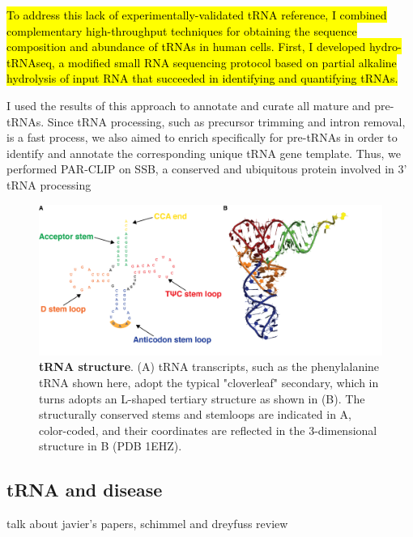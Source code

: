 \documentclass[12pt]{rockefeller}
\begin{document}
\hl{To address this lack of experimentally-validated tRNA reference, I combined complementary high-throughput techniques for obtaining the sequence composition and abundance of tRNAs in human cells. First, I developed hydro-tRNAseq, a modified small RNA sequencing protocol based on partial alkaline hydrolysis of input RNA that succeeded in identifying and quantifying tRNAs.}

I used the results of this approach to annotate and curate all mature and pre-tRNAs. Since tRNA processing, such as precursor trimming and intron removal, is a fast process\cite{Foretek:2016ea}, we also aimed to enrich specifically for pre-tRNAs in order to identify and annotate the corresponding unique tRNA gene template. Thus, we performed PAR-CLIP on SSB, a conserved and ubiquitous protein involved in 3’ tRNA processing \cite{Bayfield:2009cx,Bayfield:2010cs,Stefano:1984wp}

\begin{figure}[!ht]%
\centering
\includegraphics[width=\textwidth]{tRNA_general_structure.png}%
\caption[tRNA structure]{\textbf{tRNA structure}. (A) tRNA transcripts, such as the phenylalanine tRNA shown here, adopt the typical "cloverleaf" secondary, which in turns adopts an L-shaped tertiary structure as shown in (B). The structurally conserved stems and stemloops are indicated in A, color-coded, and their coordinates are reflected in the 3-dimensional structure in B (PDB 1EHZ).
}
\label{tRNAstructure}%
\end{figure}

\subsection{tRNA and disease} 
talk about javier's papers, schimmel and dreyfuss review
\end{document}
